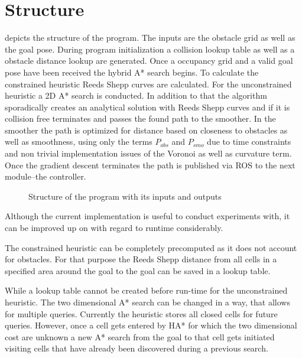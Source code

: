 \section{Structure}
 depicts the structure of the program. The inputs are the obstacle grid as well as the goal pose. During program initialization a collision lookup table as well as a obstacle distance lookup are generated. Once a occupancy grid and a valid goal pose have been received the hybrid A* search begins. To calculate the constrained heuristic Reeds Shepp curves are calculated. For the unconstrained heuristic a 2D A* search is conducted. In addition to that the algorithm sporadically creates an analytical solution with Reeds Shepp curves and if it is collision free terminates and passes the found path to the smoother. In the smoother the path is optimized for distance based on closeness to obstacles as well as smoothness, using only the terms $P_{obs}$ and $P_{smo}$ due to time constraints and non trivial implementation issues of the Voronoi as well as curvature term. Once the gradient descent terminates the path is published via ROS to the next module--the controller.

\begin{figure}[h]
    \caption{Structure of the program with its inputs and outputs}
    \label{fig:programStructure}
\end{figure}

Although the current implementation is useful to conduct experiments with, it can be improved up on with regard to runtime considerably.

The constrained heuristic can be completely precomputed as it does not account for obstacles. For that purpose the Reeds Shepp distance from all cells in a specified area around the goal to the goal can be saved in a lookup table.

While a lookup table cannot be created before run-time for the unconstrained heuristic. The two dimensional A* search can be changed in a way, that allows for multiple queries. Currently the heuristic stores all closed cells for future queries. However, once a cell gets entered by HA* for which the two dimensional cost are unknown a new A* search from the goal to that cell gets initiated visiting cells that have already been discovered during a previous search.


